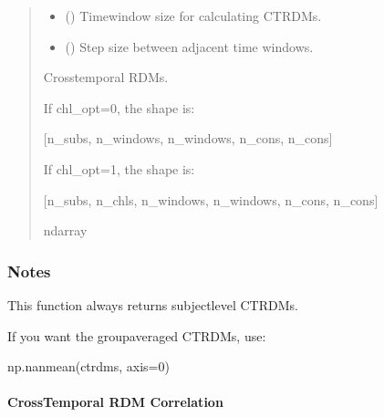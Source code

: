 \documentclass[letterpaper,10pt,english]{sphinxhowto}
\begin{document}
\begin{fulllineitems}
\begin{quote}
\begin{description}
\begin{itemize}
\begin{itemize}
\end{itemize}


\item {} 
\sphinxAtStartPar
{} (\sphinxstyleliteralemphasis{\sphinxupquote{, }}) \textendash{} Time\sphinxhyphen{}window size for calculating CTRDMs.

\item {} 
\sphinxAtStartPar
{} (\sphinxstyleliteralemphasis{\sphinxupquote{, }}) \textendash{} Step size between adjacent time windows.

\end{itemize}

\sphinxAtStartPar

\sphinxAtStartPar
{} \textendash{} Cross\sphinxhyphen{}temporal RDMs.

\sphinxAtStartPar
If chl\_opt=0, the shape is:

\sphinxAtStartPar
{[}n\_subs, n\_windows, n\_windows, n\_cons, n\_cons{]}

\sphinxAtStartPar
If chl\_opt=1, the shape is:

\sphinxAtStartPar
{[}n\_subs, n\_chls, n\_windows, n\_windows, n\_cons, n\_cons{]}


\sphinxAtStartPar
ndarray

\end{description}\end{quote}
\subsubsection*{Notes}

\sphinxAtStartPar
This function always returns subject\sphinxhyphen{}level CTRDMs.

\sphinxAtStartPar
If you want the group\sphinxhyphen{}averaged CTRDMs, use:

\sphinxAtStartPar
np.nanmean(ctrdms, axis=0)

\end{fulllineitems}


\sphinxstepscope

\clearpage


\paragraph{Cross\sphinxhyphen{}Temporal RDM Correlation}
\label{\detokenize{ctrdm_corr:cross-temporal-rdm-correlation}}\label{\detokenize{ctrdm_corr::doc}}
\sphinxAtStartPar
{}
\end{document}
